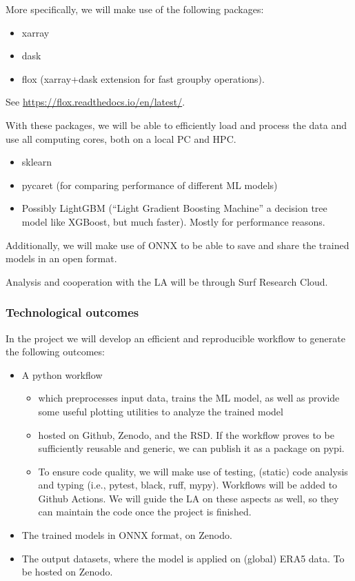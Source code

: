 More specifically, we will make use of the following packages: 
\begin{description}[font=\itshape]
  \item[Data intake/processing:] \hfill
\begin{itemize}
\item xarray 
\item dask 
\item flox (xarray+dask extension for fast groupby operations).
\end{itemize}
 \item See \url{https://flox.readthedocs.io/en/latest/}.
 \item With these packages, we will be able to efficiently load and process the data and use all computing cores, both on a
local PC and HPC. 
\item[Machine learning:] \hfill
\begin{itemize}
\item sklearn
\item pycaret (for comparing performance of different ML models)
\item Possibly LightGBM (“Light Gradient Boosting Machine” a decision tree model like XGBoost, but much faster).
Mostly for performance reasons.
\end{itemize}
\item Additionally, we will make use of ONNX to be able to save and share the trained models in an open format.
\end{description}

Analysis and cooperation with the LA will be through Surf Research Cloud. 


\subsubsection{Technological outcomes}

In the project we will develop an efficient and reproducible workflow to generate the following outcomes:
\begin{itemize}
\item A python workflow
  \begin{itemize}
  \item which preprocesses input data, trains the ML model, as well as provide some useful plotting utilities to analyze the
trained model
  \item hosted on Github, Zenodo, and the RSD. If the workflow proves to be sufficiently reusable and generic, we can publish it
as a package on pypi.
  \item To ensure code quality, we will make use of testing, (static) code analysis and typing (i.e., pytest, black, ruff,
mypy). Workflows will be added to Github Actions. We will guide the LA on these aspects as well, so they can maintain
the code once the project is finished.
  \end{itemize}
\item The trained models in ONNX format, on Zenodo.
\item The output datasets, where the model is applied on (global) ERA5 data. To be hosted on Zenodo.
\end{itemize}

